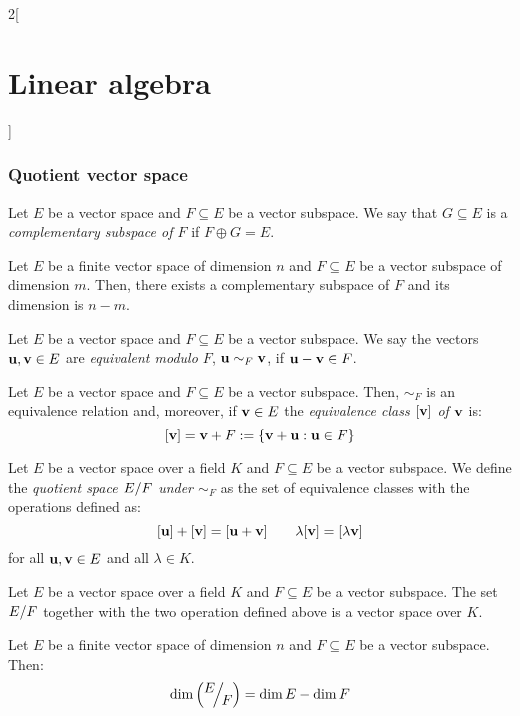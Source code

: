 \documentclass[../../../main.tex]{subfiles}
\begin{document}
\begin{multicols}{2}[\section{Linear algebra}]
\subsubsection*{Quotient vector space}
\begin{definition}
    Let $E$ be a vector space and $F\subseteq E$ be a vector subspace. We say that $G\subseteq E$ is a \textit{complementary subspace of $F$} if $F\oplus G=E$.
\end{definition}
\begin{definition}
    Let $E$ be a finite vector space of dimension $n$ and $F\subseteq E$ be a vector subspace of dimension $m$. Then, there exists a complementary subspace of $F$ and its dimension is $n-m$.
\end{definition}
\begin{definition}
    Let $E$ be a vector space and $F\subseteq E$ be a vector subspace. We say the vectors $\vb{u},\vb{v}\in E$ are \textit{equivalent modulo $F$}, $\vb{u}\sim_F\vb{v}$, if $\vb{u}-\vb{v}\in F$.
\end{definition}
\begin{lemma}
    Let $E$ be a vector space and $F\subseteq E$ be a vector subspace. Then, $\sim_F$ is an equivalence relation and, moreover, if $\vb{v}\in E$ the \textit{equivalence class $[\vb{v}]$ of $\vb{v}$} is: $$[\vb{v}]=\vb{v}+F:=\{\vb{v}+\vb{u}:\vb{u}\in F\}$$
\end{lemma}
\begin{definition}
    Let $E$ be a vector space over a field $K$ and $F\subseteq E$ be a vector subspace. We define the \textit{quotient space $\quot{E}{F}$ under $\sim_F$} as the set of equivalence classes with the operations defined as:
    $$[\vb{u}]+[\vb{v}]=[\vb{u}+\vb{v}]\qquad \lambda[\vb{v}]=[\lambda\vb{v}]$$
    for all $\vb{u},\vb{v}\in E$ and all $\lambda\in K$.
\end{definition}
\begin{prop}
    Let $E$ be a vector space over a field $K$ and $F\subseteq E$ be a vector subspace. The set $\quot{E}{F}$ together with the two operation defined above is a vector space over $K$.
\end{prop}
\begin{prop}
    Let $E$ be a finite vector space of dimension $n$ and $F\subseteq E$ be a vector subspace. Then: $$\dim\left(\quot{E}{F}\right)=\dim E-\dim F$$
\end{prop}

\end{multicols}
\end{document}
